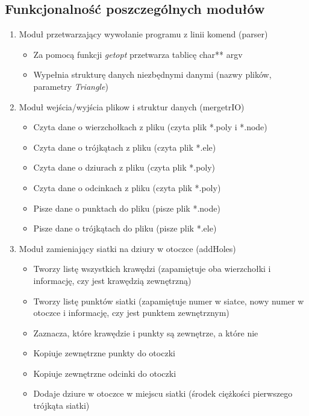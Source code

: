 \documentclass[a4paper,12pt,twoside]{article}
\begin{document}
\subsection{Funkcjonalność poszczególnych modułów}
\begin{enumerate}

\item Moduł przetwarzający wywołanie programu z linii komend (parser)

\begin{itemize}
\item Za pomocą funkcji \textit{getopt} przetwarza tablicę char** argv
\item Wypełnia strukturę danych niezbędnymi danymi (nazwy plików, parametry \textit{Triangle})
\end{itemize}

\item Moduł wejścia/wyjścia plikow i struktur danych (mergetrIO)
\begin{itemize}
\item Czyta dane o wierzchołkach z pliku (czyta plik *.poly i *.node)
\item Czyta dane o trójkątach z pliku (czyta plik *.ele)
\item Czyta dane o dziurach z pliku (czyta plik *.poly)
\item Czyta dane o odcinkach z pliku (czyta plik *.poly)
\item Pisze dane o punktach do pliku (pisze plik *.node)
\item Pisze dane o trójkątach do pliku (pisze plik *.ele)
\end{itemize}

\item Moduł zamieniający siatki na dziury w otoczce (addHoles)

\begin{itemize}
\item Tworzy listę wszystkich krawędzi (zapamiętuje oba wierzchołki i informację, czy jest krawędzią zewnętrzną)
\item Tworzy listę punktów siatki (zapamiętuje numer w siatce, nowy numer w otoczce i informację, czy jest punktem zewnętrznym)
\item Zaznacza, które krawędzie i punkty są zewnętrze, a które nie
\item Kopiuje zewnętrzne punkty do otoczki
\item Kopiuje zewnętrzne odcinki do otoczki
\item Dodaje dziure w otoczce w miejscu siatki (środek ciężkości pierwszego trójkąta siatki)
\end{itemize}


\end{enumerate}
\end{document}
